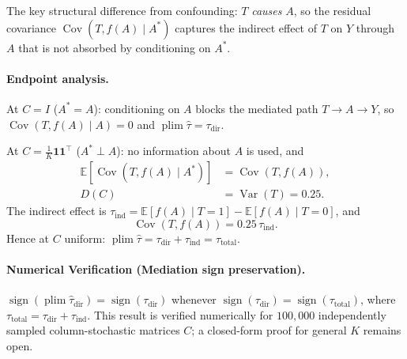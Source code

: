 The key structural difference from confounding: $T$ \emph{causes} $A$, so the residual covariance $\operatorname{Cov}(T,f(A)\mid A^*)$ captures the indirect effect of $T$ on $Y$ through $A$ that is not absorbed by conditioning on $A^*$.

\paragraph{Endpoint analysis.}

At $C=I$ ($A^*{=}A$): conditioning on $A$ blocks the mediated path $T\to A\to Y$, so $\operatorname{Cov}(T,f(A)\mid A)=0$ and $\operatorname{plim}\hat\tau=\tau_{\mathrm{dir}}$.

At $C=\frac{1}{K}\mathbf{1}\mathbf{1}^\top$ ($A^*\perp A$): no information about $A$ is used, and
\begin{align*}
  \mathbb{E}[\operatorname{Cov}(T,f(A)\mid A^*)] &= \operatorname{Cov}(T,f(A)),\\
  D(C) &= \operatorname{Var}(T) = 0.25.
\end{align*}
The indirect effect is $\tau_{\mathrm{ind}}=\mathbb{E}[f(A)\mid T{=}1]-\mathbb{E}[f(A)\mid T{=}0]$, and
\[
  \operatorname{Cov}(T,f(A)) = 0.25\,\tau_{\mathrm{ind}}.
\]
Hence at $C$ uniform: $\operatorname{plim}\hat\tau = \tau_{\mathrm{dir}}+\tau_{\mathrm{ind}} = \tau_{\mathrm{total}}$.

\paragraph{Numerical Verification (Mediation sign preservation).}
\label{find:med_sign}
$\operatorname{sign}(\operatorname{plim}\hat\tau_{\mathrm{dir}})=\operatorname{sign}(\tau_{\mathrm{dir}})$ whenever $\operatorname{sign}(\tau_{\mathrm{dir}})=\operatorname{sign}(\tau_{\mathrm{total}})$, where $\tau_{\mathrm{total}}=\tau_{\mathrm{dir}}+\tau_{\mathrm{ind}}$.
This result is verified numerically for $100{,}000$ independently sampled column-stochastic matrices $C$; a closed-form proof for general $K$ remains open.

